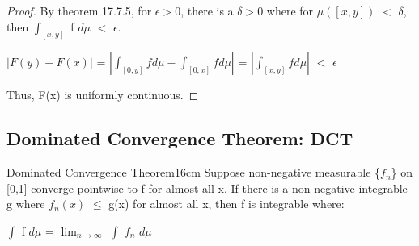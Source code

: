     \begin{proof}
        By {\color{red} theorem 17.7.5}, for $\epsilon > 0$,
        there is a $\delta > 0$ where for $\mu([x,y])$ $<$ $\delta$, then
        $\int_{[x,y]}$ f $d\mu$ $<$ $\epsilon$.

        \hspace{0.5cm}
        $|F(y) - F(x)|$
        = $|\int_{[0,y]} f d\mu - \int_{[0,x]} f d\mu|$
        = $|\int_{[x,y]} f d\mu|$
        $<$ $\epsilon$

        Thus, F(x) is uniformly continuous.
    \end{proof}

    \vspace{0.5cm}





\subsection{ Dominated Convergence Theorem: DCT }

    \begin{wtheorem}{Dominated Convergence Theorem}{16cm}
        Suppose non-negative measurable \{$f_n$\} on [0,1]
        converge pointwise to f for almost all x.
        If there is a non-negative integrable g where
        $f_n(x)$ $\leq$ g(x) for almost all x, then f is integrable where:

        \hspace{0.5cm}
        $\int$ f $d\mu$ = $\lim_{n \rightarrow \infty}$ $\int$ $f_n$ $d\mu$
    \end{wtheorem}

